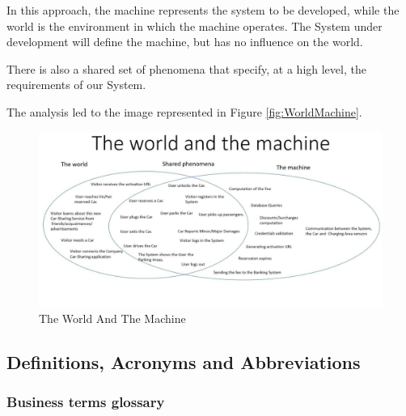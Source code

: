 In this approach, the machine represents the system to be developed, while the world is the environment in which the machine operates.
The System under development will define the machine, but has no influence on the world.

There is also a shared set of phenomena that specify, at a high level, the requirements of our System.

The analysis led to the image represented in Figure \ref{fig:WorldMachine}.
\begin{figure}[!htbp]
\centering
\includegraphics[width=\linewidth,keepaspectratio]{../The_world_and_the_machine.jpg}
\caption{The World And The Machine}
\end{figure}
\label{fig:WorldMachine}
\FloatBarrier

\subsection{Definitions, Acronyms and Abbreviations}
\subsubsection{Business terms glossary}
